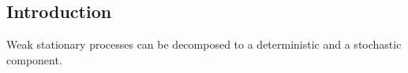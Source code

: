 
\subsection{Introduction}

Weak stationary processes can be decomposed to a deterministic and a stochastic component.
